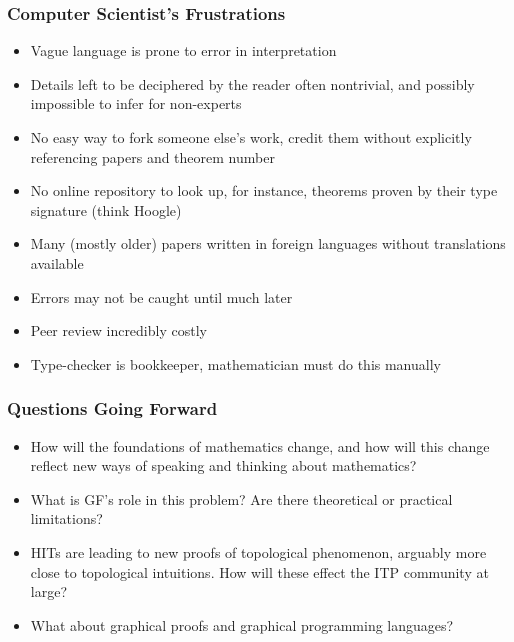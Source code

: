 \documentclass[9pt]{beamer}
\begin{document}
\begin{frame}
\frametitle{Computer Scientist's Frustrations}
\begin{itemize}
\item Vague language is prone to error in interpretation
\item Details left to be deciphered by the reader often nontrivial, and possibly impossible to infer for non-experts
\item No easy way to fork someone else's work, credit them without explicitly referencing papers and theorem number
\item No online repository to look up, for instance, theorems proven by their type signature (think Hoogle)
\item Many (mostly older) papers written in foreign languages without translations available
\item Errors may not be caught until much later
\item Peer review incredibly costly 
\item Type-checker is bookkeeper, mathematician must do this manually
\end{itemize}
\end{frame}

\begin{frame}
\frametitle{ Questions Going Forward }
\begin{itemize}
\item How will the foundations of mathematics change, and how will this change
  reflect new ways of speaking and thinking about mathematics?
\item What is GF's role in this problem? Are there theoretical or practical limitations?
\item HITs are leading to new proofs of topological phenomenon, arguably more
  close to topological intuitions. How will these effect the ITP community at large?
\item What about graphical proofs and graphical programming languages?
\end{itemize}
\end{frame}
\end{document}
